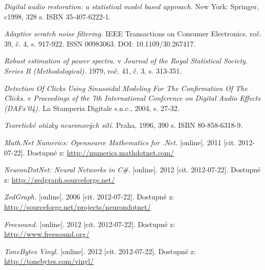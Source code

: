 \begin{thebibliography}{99}
\textit{Digital audio restoration: a statistical model based approach.}
New York: Springer, c1998, 328 s. ISBN 35-407-6222-1. 

\textit{Adaptive scratch noise filtering.}
IEEE Transactions on Consumer Electronics.
roč. 39, č. 4, s. 917-922. ISSN 00983063. DOI: 10.1109/30.267417. 

\textit{Robust estimation of power spectra.}
v \textit{Journal of the Royal Statistical Society. Series B (Methodological).}
1979, roč. 41, č. 3, s. 313-351. 

\textit{Detection Of Clicks Using Sinusoidal Modeling For The Confirmation Of The Clicks.}
v \textit{Proceedings of the 7th International Conference on Digital Audio Effects (DAFx'04).} 
La Stamperia Digitale s.n.c., 2004, s. 27-32. 

\textit{Teoretické otázky neuronových sítí.}
Praha, 1996, 390 s. ISBN 80-858-6318-9.

\textit{Math.Net Numerics: Opensource Mathematics for .Net.}
[online]. 2011 [cit. 2012-07-22]. 
Dostupné z: \url{http://numerics.mathdotnet.com/}

\textit{NeuronDotNet: Neural Networks in C\#.}
[online]. 2012 [cit. 2012-07-22]. 
Dostupné z: \mbox{\url{http://zedgraph.sourceforge.net/}}

\textit{ZedGraph.}
[online]. 2006 [cit. 2012-07-22]. 
Dostupné z: \mbox{\url{http://sourceforge.net/projects/neurondotnet/}}

\textit{Freesound.}
[online]. 2012 [cit. 2012-07-22]. 
Dostupné z: \mbox{\url{http://www.freesound.org/}}

\textit{ToneBytes Vinyl.}
[online]. 2012 [cit. 2012-07-22]. 
Dostupné z: \mbox{\url{http://tonebytes.com/vinyl/}}


\end{thebibliography}